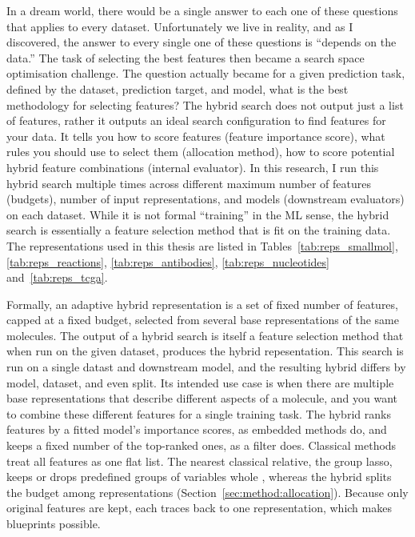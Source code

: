 In a dream world, there would be a single answer to each one of these questions that applies to every dataset. Unfortunately we live in reality, and as I discovered, the answer to every single one of these questions is ``depends on the data.'' The task of selecting the best features then became a search space optimisation challenge. The question actually became for a given prediction task, defined by the dataset, prediction target, and model, what is the best methodology for selecting features? The hybrid search does not output just a list of features, rather it outputs an ideal search configuration to find features for your data. It tells you how to score features (feature importance score), what rules you should use to select them (allocation method), how to score potential hybrid feature combinations (internal evaluator). In this research, I run this hybrid search multiple times across different maximum number of features (budgets), number of input representations, and models (downstream evaluators) on each dataset. While it is not formal ``training'' in the ML sense, the hybrid search is essentially a feature selection method that is fit on the training data. The representations used in this thesis are listed in Tables~\ref{tab:reps_smallmol}, \ref{tab:reps_reactions}, \ref{tab:reps_antibodies}, \ref{tab:reps_nucleotides} and~\ref{tab:reps_tcga}.

Formally, an adaptive hybrid representation is a set of fixed number of features, capped at a fixed budget, selected from several base representations of the same molecules. The output of a hybrid search is itself a feature selection method that when run on the given dataset, produces the hybrid repesentation. This search is run on a single datast and downstream model, and the resulting hybrid differs by model, dataset, and even split. Its intended use case is when there are multiple base representations that describe different aspects of a molecule, and you want to combine these different features for a single training task. The hybrid ranks features by a fitted model's importance scores, as embedded methods do, and keeps a fixed number of the top-ranked ones, as a filter does. Classical methods treat all features as one flat list. The nearest classical relative, the group lasso, keeps or drops predefined groups of variables whole \citep{Yuan2006}, whereas the hybrid splits the budget among representations (Section~\ref{sec:method:allocation}). Because only original features are kept, each traces back to one representation, which makes blueprints possible.


